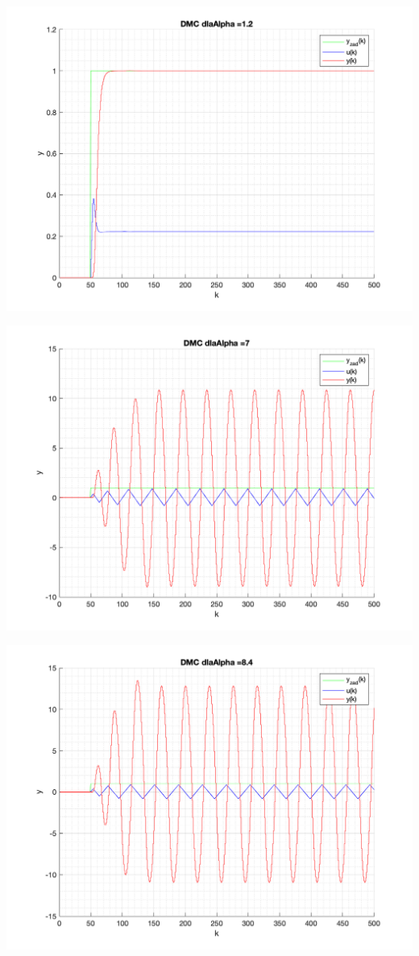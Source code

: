\documentclass[a4paper, 11pt]{article}
\begin{document}
\begin{enumerate}
 \includegraphics[width=\linewidth]{./ModelsDodatkowe_Alpha/P4_DMC_Alpha_1_2_png.png} 
 
 \includegraphics[width=\linewidth]{./ModelsDodatkowe_Alpha/P4_DMC_Alpha_7_png.png} 
 
 \includegraphics[width=\linewidth]{./ModelsDodatkowe_Alpha/P4_DMC_Alpha_8_4_png.png} 
 

\end{enumerate}
\end{document}
